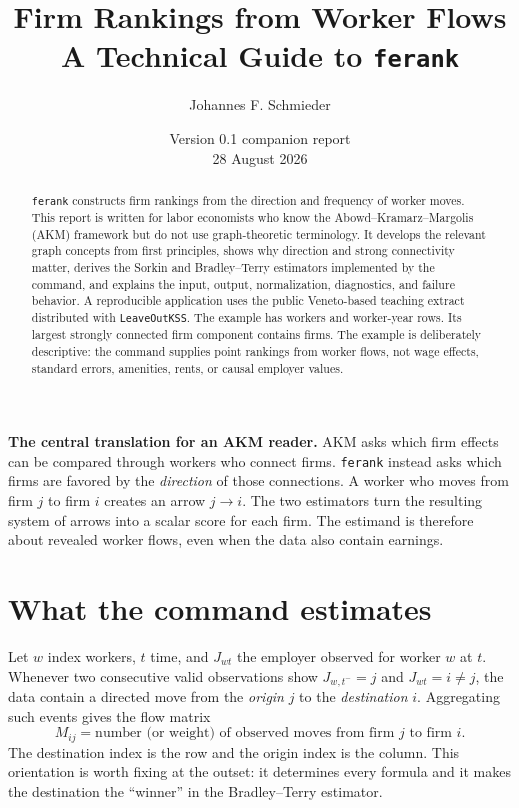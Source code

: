 \documentclass[11pt]{article}
\title{\vspace{-2em}\textbf{Firm Rankings from Worker Flows}\\[0.35em]
  \Large A Technical Guide to \texttt{ferank}}
\author{Johannes F. Schmieder}
\date{Version 0.1 companion report\\28 August 2026}
\begin{document}
\maketitle

\begin{abstract}
\noindent
\texttt{ferank} constructs firm rankings from the direction and frequency of
worker moves. This report is written for labor economists who know the
Abowd--Kramarz--Margolis (AKM) framework but do not use graph-theoretic
terminology. It develops the relevant graph concepts from first principles,
shows why direction and strong connectivity matter, derives the Sorkin and
Bradley--Terry estimators implemented by the command, and explains the input,
output, normalization, diagnostics, and failure behavior. A reproducible
application uses the public Veneto-based teaching extract distributed with
\texttt{LeaveOutKSS}. The example has \VenetoWorkers{} workers and
\VenetoRows{} worker-year rows. Its largest strongly connected firm component
contains \VenetoLargestSCC{} firms. The example is deliberately descriptive:
the command supplies point rankings from worker flows, not wage effects,
standard errors, amenities, rents, or causal employer values.
\end{abstract}

\vspace{0.4em}
\colorbox{feranklight}{\begin{minipage}{0.95\linewidth}\small
\textbf{The central translation for an AKM reader.}
AKM asks which firm effects can be compared through workers who connect firms.
\texttt{ferank} instead asks which firms are favored by the \emph{direction}
of those connections. A worker who moves from firm $j$ to firm $i$ creates an
arrow $j\rightarrow i$. The two estimators turn the resulting system of arrows
into a scalar score for each firm. The estimand is therefore about revealed
worker flows, even when the data also contain earnings.
\end{minipage}}

\tableofcontents
\newpage

\section{What the command estimates}
\label{sec:estimand}

Let $w$ index workers, $t$ time, and $J_{wt}$ the employer observed for worker
$w$ at $t$. Whenever two consecutive valid observations show
$J_{w,t^-}=j$ and $J_{wt}=i\neq j$, the data contain a directed move from the
\emph{origin} $j$ to the \emph{destination} $i$. Aggregating such events gives
the flow matrix
\begin{equation}
  M_{ij}=\text{number (or weight) of observed moves from firm $j$ to firm $i$}.
  \label{eq:flowmatrix}
\end{equation}
The destination index is the row and the origin index is the column. This
orientation is worth fixing at the outset: it determines every formula and it
makes the destination the ``winner'' in the Bradley--Terry estimator.
\end{document}
